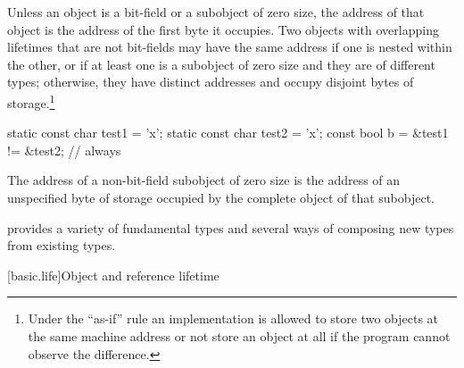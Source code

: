 \pnum
{}%
%
Unless an object is a bit-field or a subobject of zero size, the
address of that object is the address of the first byte it occupies.
Two objects
with overlapping lifetimes
that are not bit-fields
may have the same address
if one is nested within the other,
or
if at least one is a subobject of zero size
and they are of different types;
otherwise, they have distinct addresses
and occupy disjoint bytes of storage.\footnote{Under the ``as-if'' rule an
implementation is allowed to store two objects at the same machine address or
not store an object at all if the program cannot observe the
difference.}
\begin{example}
\begin{codeblock}
static const char test1 = 'x';
static const char test2 = 'x';
const bool b = &test1 != &test2;        // always 
\end{codeblock}
\end{example}
The address of a non-bit-field subobject of zero size is
the address of an unspecified byte of storage
occupied by the complete object of that subobject.

\pnum
\begin{note}
\Cpp{} provides a variety of fundamental types and several ways of composing
new types from existing types.
\end{note}%

[basic.life]{Object and reference lifetime}

